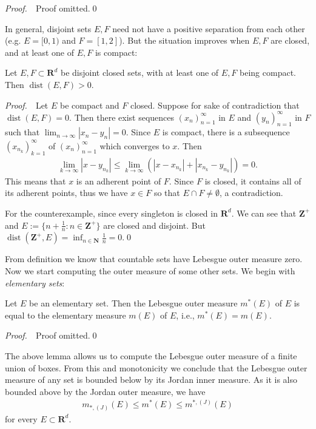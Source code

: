 \documentclass{book}
\theoremstyle{defstyle}
\theoremstyle{thmstyle}
\DeclareMathOperator{\dist}{dist}
\newcommand{\JIM}{m_{*, (J)}}%
\newcommand{\JOM}{m^{*, (J)}}%
\newcommand{\pff}{\noindent\emph{Proof.}~~}
\newcommand{\newa}{\vspace{1em}\indent}
\begin{document}
\pff Proof omitted.\qed


\newa In general, disjoint sets $E, F$ need not have a positive separation from each other (e.g. $E = [0, 1)$ and $F = [1, 2]$). But the situation improves when $E, F$ are closed, and at least one of $E, F$ is compact:

\begin{lemma}\label{thm:countable additivity for compact set}
    Let $E, F \subset \mathbf{R}^d$ be disjoint closed sets, with at least one of $E, F$ being compact. Then $\dist(E, F) > 0$.
\end{lemma}

\pff Let $E$ be compact and $F$ closed. Suppose for sake of contradiction that $\dist(E, F) = 0$. Then there exist sequences $(x_n)_{n = 1}^{\infty}$ in $E$ and $(y_n)_{n = 1}^{\infty}$ in $F$ such that $\lim_{n \to \infty}|x_n - y_n| = 0$. Since $E$ is compact, there is a subsequence $(x_{n_k})_{k = 1}^{\infty}$ of $(x_n)_{n = 1}^{\infty}$ which converges to $x$. Then
    \begin{align*}
        \lim_{k \to \infty}|x - y_{n_k}|
        \leq \lim_{k \to \infty}(|x - x_{n_k}| + |x_{n_k} - y_{n_k}|)
        = 0.
    \end{align*}
This means that $x$ is an adherent point of $F$. Since $F$ is closed, it contains all of its adherent points, thus we have $x \in F$ so that $E \cap F \neq \emptyset$, a contradiction.

For the counterexample, since every singleton is closed in $\mathbf{R}^d$. We can see that $\mathbf{Z}^+$ and $E := \{n + \frac{1}{n} : n \in \mathbf{Z}^+\}$ are closed and disjoint. But $\dist(\mathbf{Z}^+, E) = \inf_{n \in \mathbf{N}}\frac{1}{n} = 0$.\qed


\newa From definition we know that countable sets have Lebesgue outer measure zero. Now we start computing the outer measure of some other sets. We begin with \emph{elementary sets}:

\begin{lemma}\label{thm:outer measure of elementary sets}
    Let $E$ be an elementary set. Then the Lebesgue outer measure $m^*(E)$ of $E$ is equal to the elementary measure $m(E)$ of $E$, i.e., $m^*(E) = m(E)$.
\end{lemma}

\pff Proof omitted.\qed

\begin{remark}
    The above lemma allows us to compute the Lebesgue outer measure of a finite union of boxes. From this and monotonicity we conclude that the Lebesgue outer measure of any set is bounded below by its Jordan inner measure. As it is also bounded above by the Jordan outer measure, we have
        \begin{align}
            \JIM(E) \leq m^*(E) \leq \JOM(E)
        \end{align}
    for every $E \subset \mathbf{R}^d$.
\end{remark}
\end{document}
